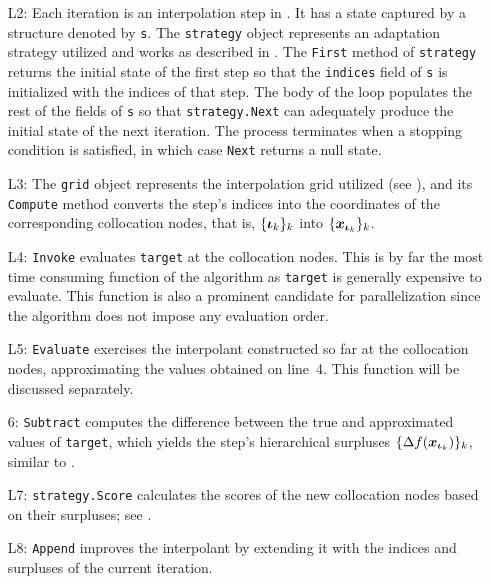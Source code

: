 \begin{itemize}

\item[L2:] Each iteration is an interpolation step in . It
has a state captured by a structure denoted by \texttt{s}. The \texttt{strategy}
object represents an adaptation strategy utilized and works as described in
. The \texttt{First} method of \texttt{strategy} returns the
initial state of the first step so that the \texttt{indices} field of \texttt{s}
is initialized with the indices of that step. The body of the loop populates the
rest of the fields of \texttt{s} so that \texttt{strategy.Next} can adequately
produce the initial state of the next iteration. The process terminates when a
stopping condition is satisfied, in which case \texttt{Next} returns a null
state.

\item[L3:] The \texttt{grid} object represents the interpolation grid utilized
(see ), and its \texttt{Compute} method converts the step's indices
into the coordinates of the corresponding collocation nodes, that is, $\{
\boldsymbol{\iota}_k \}_k$ into $\{ \boldsymbol{x}_{\boldsymbol{\iota}_k} \}_k$.

\item[L4:] \texttt{Invoke} evaluates \texttt{target} at the collocation nodes.
This is by far the most time consuming function of the algorithm as
\texttt{target} is generally expensive to evaluate. This function is also a
prominent candidate for parallelization since the algorithm does not impose any
evaluation order.

\item[L5:] \texttt{Evaluate} exercises the interpolant constructed so far at the
collocation nodes, approximating the values obtained on line~4. This function
will be discussed separately.

\item[6:] \texttt{Subtract} computes the difference between the true and
approximated values of \texttt{target}, which yields the step's hierarchical
surpluses $\{ \Delta f(\boldsymbol{x}_{\boldsymbol{\iota}_k}) \}_k$, similar to .

\item[L7:] \texttt{strategy.Score} calculates the scores of the new collocation
nodes based on their surpluses; see .

\item[L8:] \texttt{Append} improves the interpolant by extending it with the
indices and surpluses of the current iteration.

\end{itemize}

